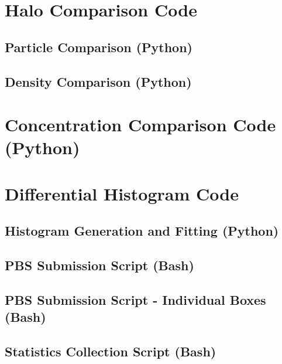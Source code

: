 \documentclass[12pt]{report}
\begin{document}
\begin{appendices}
	\chapter{Halo Comparison Code}
	\label{app:halo_comparison}
	\section{Particle Comparison (Python)}
	\label{app:particle_comparison}
	
	\section{Density Comparison (Python)}
	\label{app:density_comparison}
	

	\chapter{Concentration Comparison Code (Python)}
	\label{app:concentration_comparison}
	

	\chapter{Differential Histogram Code}
	\label{app:diff_hist}
	\section{Histogram Generation and Fitting (Python)}
	\label{app:hist}
	
	\section{PBS Submission Script (Bash)}
	\label{app:run_diff_hist}
	
	\section{PBS Submission Script - Individual Boxes (Bash)}
	\label{app:run_diff_hist_individual_boxes}
	
	\section{Statistics Collection Script (Bash)}
	\label{app:collect_stats}
	


\end{appendices}
\end{document}

